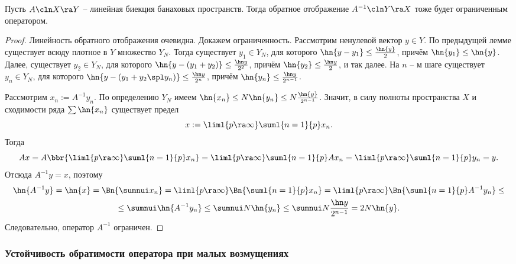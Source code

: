 \documentclass[a4paper]{article}
\begin{document}
\begin{theorem}
Пусть $A\cln X \ra Y$ -- линейная биекция банаховых пространств.
Тогда обратное отображение $A^{-1}\cln Y \ra X$ тоже будет ограниченным оператором.
\end{theorem}
\begin{proof}
Линейность обратного отображения очевидна. Докажем ограниченность.
Рассмотрим ненулевой вектор $y \in Y$. По предыдущей лемме существует всюду плотное в $Y$ множество $Y_N$.
Тогда существует $y_1 \in Y_N$, для которого $\hn{y- y_1} \le \frac{\hn{y}}{2}$, причём $\hn{y_1} \le \hn{y}$.
Далее, существует $y_2 \in Y_N$, для которого $\hn{y-(y_1+y_2)}\le\frac{\hn y}{2^2}$, причём
$\hn{y_2} \le\frac{\hn y}{2}$, и так далее.
На $n$ -- м шаге существует $y_n \in Y_N$, для которого
$\hn{y-(y_1+y_2\spl y_n)}\le\frac{\hn y}{2^n}$, причём
$\hn{y_n} \le\frac{\hn y}{2^{n-1}}$.

Рассмотрим $x_n := A^{-1}y_n$. По определению $Y_N$ имеем
$\hn{x_n} \le N\hn{y_n} \le N\frac{\hn{y}}{2^{n-1}}$.
Значит, в силу полноты пространства $X$ и сходимости ряда $\sum \hn{x_n}$ существует предел
$$x := \liml{p\ra\infty}\suml{n=1}{p} x_n.$$
Тогда
$$
  Ax = A\bbr{\liml{p\ra\infty}\suml{n=1}{p}x_n} = \liml{p\ra\infty} \suml{n=1}{p}Ax_n=
  \liml{p\ra\infty}\suml{n=1}{p}y_n=y.
$$
Отсюда $A^{-1}y=x$, поэтому
\begin{multline*}
  \hn{A^{-1}y}=\hn{x} = \Bn{\sumnui x_n} = \liml{p\ra\infty}\Bn{\suml{n=1}{p}x_n} =
  \liml{p\ra\infty}\Bn{\suml{n=1}{p}A^{-1}y_n} \le \\ \le\sumnui\hn{A^{-1}y_n} \le
  \sumnui N\hn{y_n} \le \sumnui N \frac{\hn y}{2^{n-1}} = 2N\hn{y}.
\end{multline*}
Следовательно, оператор $A^{-1}$ ограничен.
\end{proof}

\subsubsection{Устойчивость обратимости оператора при малых возмущениях}
\end{document}
